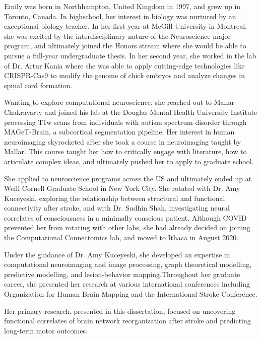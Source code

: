 \documentclass[phd,tocprelim]{cornell}
\begin{document}
\begin{biosketch}
Emily was born in Northhampton, United Kingdom in 1997, and grew up in Toronto, Canada.  In highschool, her interest in biology was nurtured  by an exceptional biology teacher.  In her first year at McGill University in Montreal, she was excited by the interdisciplinary nature of the Neuroscience major program, and ultimately joined the Honors stream where she would be able to pursue a full-year undergraduate thesis. 
In her second year, she worked in the lab of Dr. Artur Kania where she was able to apply cutting-edge technologies like CRISPR-Cas9 to modify the genome of chick embryos and analyze changes in spinal cord formation. 

 Wanting to explore computational neuroscience, she reached out to Mallar Chakravarty and joined his lab at the Douglas Mental Health University Institute processing T1w scans from individuals with autism spectrum disorder through MAGeT-Brain, a subcortical segmentation pipeline.  Her interest in human neuroimaging skyrocketed after she took a course in neuroimaging taught by Mallar. This course taught her how to critically engage with literature,  how to articulate complex ideas, and ultimately pushed her to apply to graduate school.

She applied to neuroscience programs across the US and ultimately ended up at Weill Cornell Graduate School in New York City.  She rotated with Dr. Amy Kuceyeski, exploring the relationship between structural and functional connectivity after stroke, and with Dr. Sudhin Shah,  investigating neural correlates of consciousness in a minimally conscious patient. Although COVID prevented her from rotating with other labs, she had already decided on joining the Computational Connectomics lab, and moved to Ithaca in August 2020. 

Under the guidance of Dr. Amy Kuceyeski, she developed an expertise in computational neuroimaging and image processing, graph theoretical modelling, predictive modelling, and lesion-behavior mapping.Throughout her graduate career, she presented her research at various international conferences including Organization for Human Brain Mapping and the International Stroke Conference.

Her primary research, presented in this dissertation, focused on uncovering functional correlates of brain network reorganization after stroke and predicting long-term motor outcomes. 

\end{biosketch}
\end{document}
